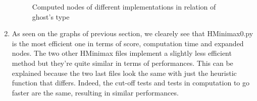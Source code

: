\documentclass{article}
\begin{document}
\begin{enumerate}[label=\alph*.,leftmargin=*]
\begin{figure}[!h]
        \caption{Computed nodes of different implementations in relation of ghost's type}  
    \end{figure}
    \newpage
    \item As seen on the graphs of previous section, we clearely see that HMinimax0.py is the most efficient one in terms of score, computation time and expanded nodes.
    The two other HMinimax files implement a slightly less efficient method but they're quite similar in terms of performances. This can be explained because the two last files
    look the same with just the heuristic function that differs. Indeed, the cut-off tests and tests in computation to go faster are the same, resulting in similar performances.
\end{enumerate}



\end{document}
